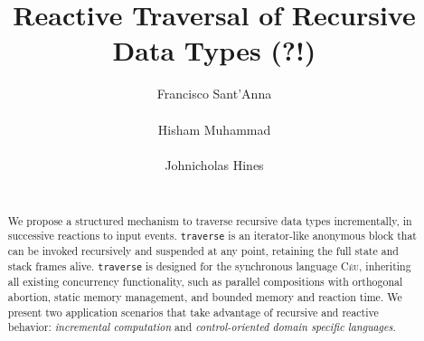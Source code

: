 \documentclass{acm_proc_article-sp}
\newcommand{\CEU}{\textsc{C\'{e}u}\xspace}
\newcommand{\code}[1] {{\small{\texttt{#1}}}}
\begin{document}
\title{Reactive Traversal of Recursive Data Types (?!)}

\author{
\alignauthor
Francisco Sant'Anna \\
     \\
\alignauthor
Hisham Muhammad \\
     \\
\alignauthor
Johnicholas Hines \\
     \\
}

\maketitle
\begin{abstract}
We propose a structured mechanism to traverse recursive data types 
incrementally, in successive reactions to input events.
\code{traverse} is an iterator-like anonymous block that can be invoked 
recursively and suspended at any point, retaining the full state and stack 
frames alive.
\code{traverse} is designed for the synchronous language \CEU, inheriting all 
existing concurrency functionality, such as parallel compositions with 
orthogonal abortion, static memory management, and bounded memory and reaction 
time.
We present two application scenarios that take advantage of recursive and 
reactive behavior: \emph{incremental computation} and \emph{control-oriented 
domain specific languages}.

\begin{comment}
MIX OF:
\begin{itemize}
    \item recursive calls to anonymous closures
    \item each instance---many co-routines
\end{itemize}

DESIGNED FOR \CEU:
\begin{itemize}
    \item lexical compositions
    \item static memory management
    \item bounded execution/memory
    \item reactive
    \item mutation
\end{itemize}
\end{comment}

\end{abstract}
\end{document}
